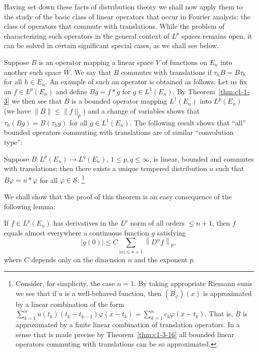 Having set down these facts of distribution theory we shall now apply them to
the study of the basic class of linear operators that occur in Fourier
analysis: the class of operators that commute with translations. While the
problem of characterizing such operators in the general context of $L^{p}$
spaces remains open, it can be solved in certain significant special cases, as
we shall see below.

Suppose $B$ is an operator mapping a linear space $V$ of functions on $E_{n}$
into another such space $W$. We say that $B$ commutes with translations if
$\tau_{h}B = B\tau_{h}$ for all $h \in E_{n}$. An example of such an operator
is obtained as follows: Let us fix an $f \in L^{p}(E_{n})$ and define
$Bg = f * g$ for $g \in L^{1}(E_{n})$. By Theorem~\ref{thm:c1-1-3} we then see
that $B$ is a bounded operator mapping $L^{1}(E_{n})$ into $L^{p}(E_{n})$ (we
have $\|B\| \leq \|f\|_{p}$) and a change of variables shows that
$\tau_{h}(Bg) = B(\tau_{h}g)$ for all $g \in L^{1}(E_{n})$. The following
result shows that ``all'' bounded operators commuting with translations are of
similar ``convolution type'':

\begin{theorem}\label{thm:c1-3-16}
Suppose $B\colon L^{p}(E_{n})\to L^{q}(E_{n})$, $1\leq p,q\leq\infty$, is
linear, bounded and commutes with translations; then there exists a unique
tempered distribution $u$ such that $B\varphi = u * \varphi$ for all
$\varphi \in \mathscr{S}$.%
\footnote{Consider, for simplicity, the case $n = 1$. By taking appropriate
Riemann sums we see that if $u$ is a well-behaved function, then
$(B_{\varphi})(x)$ is approximated by a linear combination of the form
$\sum_{k=1}^{n} u(t_{k})(t_{k}-t_{k-1})\varphi(x-t_{k})=\sum_{k=1}^{n} c_{k}\varphi(x-t_{k})$.
That is, $B$ is approximated by a finite linear combination of translation
operators. In a sense that is made precise by Theorem~\ref{thm:c1-3-16} all
bounded linear operators commuting with translations can be so approximated.}
\end{theorem}

We shall show that the proof of this theorem is an easy consequence of the
following lemma:

\begin{lemma}\label{lem:c1-3-17}
If $f \in L^{p}(E_{n})$ has derivatives in the $L^{p}$ norm of all orders
$\leq n + 1$, then $f$ equals almost everywhere a continuous function $g$
satisfying
\[
\left|g(0)\right|\leq C\sum_{|\alpha|\leq n+1}\left\|D^{\alpha}f\right\|_{p},
\]
where $C$ depends only on the dimension $n$ and the exponent $p$.
\end{lemma}

